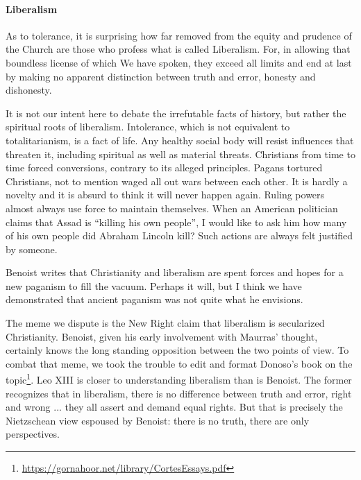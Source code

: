 \paragraph{Liberalism}

\begin{quotex}
As to tolerance, it is surprising how far removed from the equity and prudence of the Church are those who profess what is called Liberalism. For, in allowing that boundless license of which We have spoken, they exceed all limits and end at last by making no apparent distinction between truth and error, honesty and dishonesty.
\end{quotex}


It is not our intent here to debate the irrefutable facts of history, but rather the spiritual roots of liberalism. Intolerance, which is not equivalent to totalitarianism, is a fact of life. Any healthy social body will resist influences that threaten it, including spiritual as well as material threats. Christians from time to time forced conversions, contrary to its alleged principles. Pagans tortured Christians, not to mention waged all out wars between each other. It is hardly a novelty and it is absurd to think it will never happen again. Ruling powers almost always use force to maintain themselves. When an American politician claims that Assad is ``killing his own people'', I would like to ask him how many of his own people did Abraham Lincoln kill? Such actions are always felt justified by someone.

Benoist writes that Christianity and liberalism are spent forces and hopes for a new paganism to fill the vacuum. Perhaps it will, but I think we have demonstrated that ancient paganism was not quite what he envisions.

The meme we dispute is the New Right claim that liberalism is secularized Christianity. Benoist, given his early involvement with Maurras' thought, certainly knows the long standing opposition between the two points of view. To combat that meme, we took the trouble to edit and format Donoso's book on the topic\footnote{\url{https://gornahoor.net/library/CortesEssays.pdf}}. Leo XIII is closer to understanding liberalism than is Benoist. The former recognizes that in liberalism, there is no difference between truth and error, right and wrong ... they all assert and demand equal rights. But that is precisely the Nietzschean view espoused by Benoist: there is no truth, there are only perspectives.

